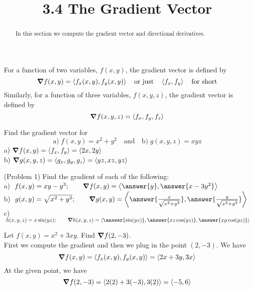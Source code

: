\documentclass[handout]{ximera}
\title{3.4 The Gradient Vector}
\begin{document}
\begin{abstract}
In this section we compute the gradient vector and directional derivatives.
\end{abstract}

\maketitle

\begin{definition}
For a function of two variables, $f(x,y)$, the gradient vector is defined by
\[
\boldsymbol\nabla f(x,y) = \left\langle f_x(x,y), f_y(x,y)\right\rangle \quad \text{or just} \quad \left\langle f_x, f_y\right\rangle \quad \text{for short}
\]
Similarly, for a function of three variables, $f(x,y, z)$, the gradient vector is defined by
\[
\boldsymbol\nabla f(x,y, z) = \left\langle f_x, f_y, f_z\right\rangle
\]
\end{definition}

\begin{example}[Example 1]
Find the gradient vector for 
\[
\text{a)} \;f(x,y) = x^2 + y^2\quad \text{and} \quad  \text{b)} \;g(x, y, z) = xyz
\]
a) $\boldsymbol\nabla f(x,y) = \left\langle f_x, f_y\right\rangle = \left\langle 2x, 2y\right\rangle$ \\
b) $\boldsymbol\nabla g(x,y, z) = \left\langle g_x, g_y, g_z\right\rangle= \left\langle yz, xz, yz\right\rangle$
\end{example}

\begin{problem}(Problem 1)
Find the gradient of each of the following:\\
a) $\;f(x,y) = xy - y^3; \quad \quad \grad f(x,y) = \vector{\answer{y}, \answer{x - 3y^2}}$\\
b) $\;g(x,y) = \sqrt{x^2 + y^2}; \quad \quad  \grad g(x,y) = \vector{\answer{\frac{x}{\sqrt{x^2 + y^2}}}, \answer{\frac{y}{\sqrt{x^2 + y^2}}}}$\\
c) $\;h(x,y, z) = x\sin(yz); \quad \quad \grad h(x,y, z) = \vector{\answer{\sin(yz)}, \answer{xz\cos(yz)} , \answer{xy\cos(yz)} }$\\
\end{problem}


\begin{example}[Example 2]
Let $f(x,y) = x^2 + 3xy$.  Find $\boldsymbol\nabla f(2, -3)$.\\
First we compute the gradient and then we plug in the point $(2, -3)$.  We have
\[
\boldsymbol\nabla f(x,y) = \left\langle f_x(x,y), f_y(x,y)\right\rangle = \left\langle 2x + 3y, 3x\right\rangle
\]
At the given point, we have
\[
\boldsymbol\nabla f(2, -3) = \left\langle 2(2) + 3(-3), 3(2)\right\rangle = \left\langle -5, 6\right\rangle
\]
\end{example}
\end{document}
